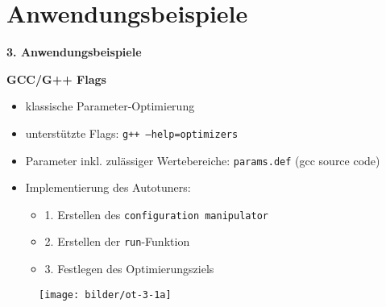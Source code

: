     \section{Anwendungsbeispiele}
    
    \begingroup
    \begin{frame}
      \textbf{3. Anwendungsbeispiele} \newline
      
    \textbf{GCC/G++ Flags}
      \begin{itemize}
        \item klassische Parameter-Optimierung
        \item unterstützte Flags: \texttt{g++ --help=optimizers}
        \item Parameter inkl. zulässiger Wertebereiche: \texttt{params.def} (gcc source code)
        
        \text{}
        
        \item Implementierung des Autotuners:
        \begin{itemize}
          \item 1. Erstellen des \texttt{configuration manipulator}
          
          \item 2. Erstellen der \texttt{run}-Funktion
          \item 3. Festlegen des Optimierungsziels
          
        \end{itemize}
      \end{itemize}
    \end{frame}
    \endgroup
        
    \begingroup
  \begin{frame}
    \begin{figure}[ht]
      \centering	      
      \texttt{[image: bilder/ot-3-1a]}
      \label{gccpy1a}
    \end{figure}
  \end{frame}
  \endgroup
  
